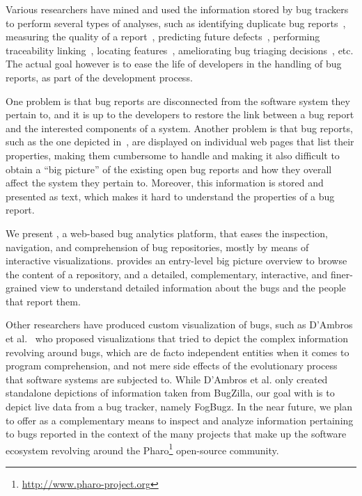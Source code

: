 Various researchers have mined and used the information stored by bug trackers to perform several types of analyses, such as identifying duplicate bug reports~\cite{Wang2008a}, measuring the quality of a report~\cite{Zimm2010a}, predicting future defects~\cite{DAmb2012a}, performing traceability linking~\cite{Biss2013a}, locating features~\cite{Dit2013a}, ameliorating bug triaging decisions~\cite{Anvi2006a}, etc. The actual goal however is to ease the life of developers in the handling of bug reports, as part of the development process.

One problem is that bug reports are disconnected from the software system they pertain to, and it is up to the developers to restore the link between a bug report and the interested components of a system. Another problem is that bug reports, such as the one depicted in~, are displayed on individual web pages that list their properties, making them cumbersome to handle and making it also difficult to obtain a ``big picture'' of the existing open bug reports and how they overall affect the system they pertain to. Moreover, this information is stored and presented as text, which makes it hard to understand the properties of a bug report.

We present \ib, a web-based bug analytics platform, that eases the inspection, navigation, and comprehension of bug repositories, mostly by means of interactive visualizations. \ib provides an entry-level big picture overview to browse the content of a repository, and a detailed, complementary, interactive, and finer-grained view to understand detailed information about the bugs and the people that report them.

Other researchers have produced custom visualization of bugs, such as D'Ambros et al.~\cite{DAmb2007a,DAmb2007b} who proposed visualizations that tried to depict the complex information revolving around bugs, which are de facto independent entities when it comes to program comprehension, and not mere side effects of the evolutionary process that software systems are subjected to.
While D'Ambros et al. only created standalone depictions of information taken from BugZilla, our goal with \ib is to depict live data from a bug tracker, namely FogBugz.
In the near future, we plan to offer \ib as a complementary means to inspect and analyze information pertaining to bugs reported in the context of the many projects that make up the software ecosystem revolving around the Pharo\footnote{\url{http://www.pharo-project.org}} open-source community.

